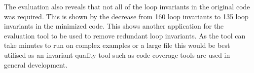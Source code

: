 The evaluation also reveals that not all of the loop invariants in the original
code was required.
This is shown by the decrease from 160 loop invariants to 135 loop invariants
in the minimized code.
This shows another application for the evaluation tool to be used to remove redundant
loop invariants.
As the tool can take minutes to run on complex examples or a large file this
would be best utilised as an invariant quality tool such as code coverage tools
are used in general development.
